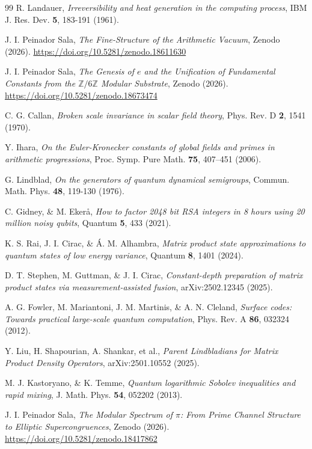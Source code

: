 \documentclass[12pt,a4paper]{article}
\theoremstyle{plain}
\theoremstyle{definition}
\theoremstyle{remark}
\begin{document}
\begin{thebibliography}{99}
R. Landauer, \textit{Irreversibility and heat generation in the computing process}, IBM J. Res. Dev. \textbf{5}, 183-191 (1961).

J. I. Peinador Sala, \textit{The Fine-Structure of the Arithmetic Vacuum}, Zenodo (2026). \url{https://doi.org/10.5281/zenodo.18611630}

J. I. Peinador Sala, \textit{The Genesis of $e$ and the Unification of Fundamental Constants from the $\mathbb{Z}/6\mathbb{Z}$ Modular Substrate}, Zenodo (2026). \url{https://doi.org/10.5281/zenodo.18673474}

C. G. Callan, \textit{Broken scale invariance in scalar field theory}, Phys. Rev. D \textbf{2}, 1541 (1970).

Y. Ihara, \textit{On the Euler-Kronecker constants of global fields and primes in arithmetic progressions}, Proc. Symp. Pure Math. \textbf{75}, 407–451 (2006).

G. Lindblad, \textit{On the generators of quantum dynamical semigroups}, Commun. Math. Phys. \textbf{48}, 119-130 (1976).

C. Gidney, \& M. Ekerå, \textit{How to factor 2048 bit RSA integers in 8 hours using 20 million noisy qubits}, Quantum \textbf{5}, 433 (2021).

K. S. Rai, J. I. Cirac, \& Á. M. Alhambra, \textit{Matrix product state approximations to quantum states of low energy variance}, Quantum \textbf{8}, 1401 (2024).

D. T. Stephen, M. Guttman, \& J. I. Cirac, \textit{Constant-depth preparation of matrix product states via measurement-assisted fusion}, arXiv:2502.12345 (2025).

A. G. Fowler, M. Mariantoni, J. M. Martinis, \& A. N. Cleland, \textit{Surface codes: Towards practical large-scale quantum computation}, Phys. Rev. A \textbf{86}, 032324 (2012).

Y. Liu, H. Shapourian, A. Shankar, et al., \textit{Parent Lindbladians for Matrix Product Density Operators}, arXiv:2501.10552 (2025).

M. J. Kastoryano, \& K. Temme, \textit{Quantum logarithmic Sobolev inequalities and rapid mixing}, J. Math. Phys. \textbf{54}, 052202 (2013).

J. I. Peinador Sala, \textit{The Modular Spectrum of $\pi$: From Prime Channel Structure to Elliptic Supercongruences}, Zenodo (2026). \url{https://doi.org/10.5281/zenodo.18417862}

\end{thebibliography}
\end{document}
